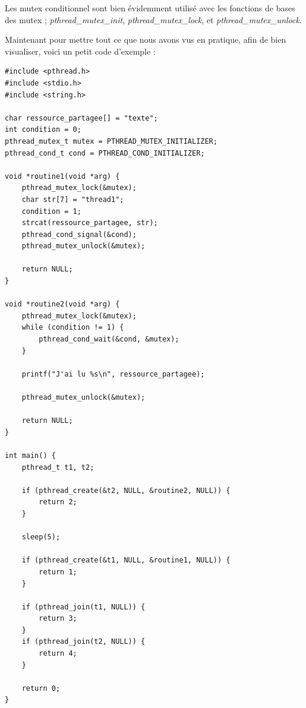  \vspace{\baselineskip}

Les mutex conditionnel sont bien évidemment utilisé avec les fonctions de bases des mutex ; \textit{pthread\_mutex\_init}, \textit{pthread\_mutex\_lock}, et \textit{pthread\_mutex\_unlock}.

Maintenant pour mettre tout ce que nous avons vus en pratique, afin de bien visualiser, voici un petit code d'exemple :
\vspace{\baselineskip}
\begin{lstlisting}[title = Code mutex conditionnel]
#include <pthread.h>
#include <stdio.h>
#include <string.h>

char ressource_partagee[] = "texte";
int condition = 0;
pthread_mutex_t mutex = PTHREAD_MUTEX_INITIALIZER;
pthread_cond_t cond = PTHREAD_COND_INITIALIZER;

void *routine1(void *arg) {
    pthread_mutex_lock(&mutex);
    char str[7] = "thread1";
    condition = 1;
    strcat(ressource_partagee, str);
    pthread_cond_signal(&cond);
    pthread_mutex_unlock(&mutex);

    return NULL;
}

void *routine2(void *arg) {
    pthread_mutex_lock(&mutex);
    while (condition != 1) {
        pthread_cond_wait(&cond, &mutex);
    }

    printf("J'ai lu %s\n", ressource_partagee);

    pthread_mutex_unlock(&mutex);

    return NULL;
}

int main() {
    pthread_t t1, t2;

    if (pthread_create(&t2, NULL, &routine2, NULL)) {
        return 2;
    }

    sleep(5);

    if (pthread_create(&t1, NULL, &routine1, NULL)) {
        return 1;
    }

    if (pthread_join(t1, NULL)) {
        return 3;
    }
    if (pthread_join(t2, NULL)) {
        return 4;
    }

    return 0;
}

\end{lstlisting}



